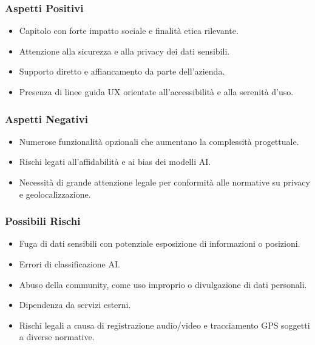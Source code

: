 \documentclass[a4paper,12pt]{article}
\begin{document}
\subsubsection*{Aspetti Positivi}
\begin{itemize}[leftmargin=*]
    \item Capitolo con forte impatto sociale e finalità etica rilevante.
    \item Attenzione alla sicurezza e alla privacy dei dati sensibili.
    \item Supporto diretto e affiancamento da parte dell’azienda.
    \item Presenza di linee guida UX orientate all’accessibilità e alla serenità d’uso.
\end{itemize}

\subsubsection*{Aspetti Negativi}
\begin{itemize}[leftmargin=*]
    \item Numerose funzionalità opzionali che aumentano la complessità progettuale.
    \item Rischi legati all’affidabilità e ai bias dei modelli AI.
    \item Necessità di grande attenzione legale per conformità alle normative su privacy e geolocalizzazione.
\end{itemize}

\subsubsection*{Possibili Rischi}
\begin{itemize}[leftmargin=*]
    \item Fuga di dati sensibili con potenziale esposizione di informazioni o posizioni.
    \item Errori di classificazione AI.
    \item Abuso della community, come uso improprio o divulgazione di dati personali.
    \item Dipendenza da servizi esterni.
    \item Rischi legali a causa di registrazione audio/video e tracciamento GPS soggetti a diverse normative.
\end{itemize}
\end{document}
